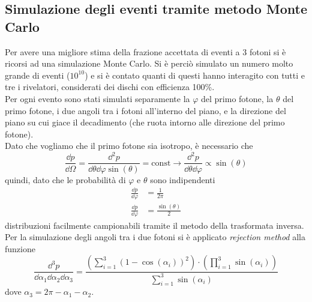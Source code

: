 \subsection{Simulazione degli eventi tramite metodo Monte Carlo}

Per avere una migliore stima della frazione accettata di eventi a 3 fotoni si è ricorsi ad una simulazione Monte Carlo. Si è perciò simulato un numero molto grande di eventi ($10^{10}$) e si è contato quanti di questi hanno interagito con tutti e tre i rivelatori, considerati dei dischi con efficienza 100\%.\\

Per ogni evento sono stati simulati separamente la $\varphi$ del primo fotone, la $\theta$ del primo fotone, i due angoli tra i fotoni all'interno del piano, e la direzione del piano su cui giace il decadimento (che ruota intorno alle direzione del primo fotone).\\

Dato che vogliamo che il primo fotone sia isotropo, è necessario che 
\begin{equation}
	\frac{\dd p}{\dd\Omega} = \frac{\dd^2 p}{\dd\theta \dd\varphi \sin(\theta)} = \mathrm{const} \rightarrow \frac{\dd^2 p}{\dd\theta \dd\varphi} \propto \sin(\theta)
\end{equation}
quindi, dato che le probabilità di $\varphi$ e $\theta$ sono indipendenti
\begin{align}
	\frac{\dd p}{\dd\varphi}& = \frac{1}{2\pi} \label{eq:varphi}\\
	\frac{\dd p}{\dd\varphi}& = \frac{\sin(\theta)}{2} \label{eq:theta}
\end{align}
distribuzioni facilmente campionabili tramite il metodo della trasformata inversa.\\

Per la simulazione degli angoli tra i due fotoni si è applicato \textit{rejection method} alla funzione
\begin{equation}
	\frac{\dd^3 p}{\dd\alpha_1 \dd\alpha_2 \dd\alpha_3} = \frac{\left(\sum_{i=1}^{3} \left(1-\cos(\alpha_i)\right)^2\right)\cdot\left(\prod_{i=1}^{3} \sin(\alpha_i)\right)}{\sum_{i=1}^{3} \sin(\alpha_i)}
\end{equation}
dove $\alpha_3=2\pi-\alpha_1-\alpha_2$.\\

